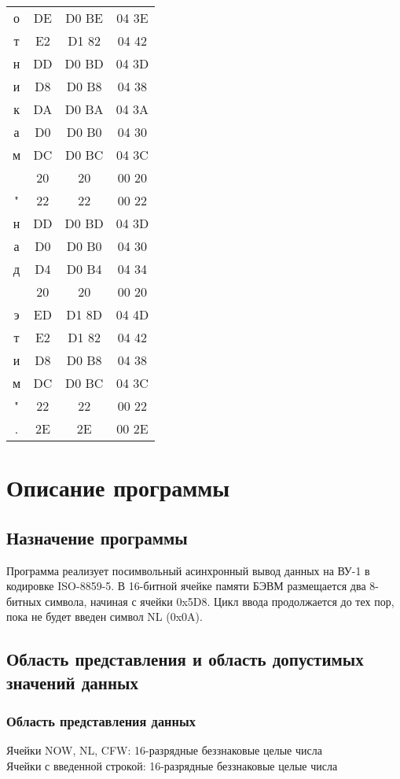 \begin{center}
\begin{tabular}{|c|c|c|c|}
	о & DE & D0 BE & 04 3E\\
	т & E2 & D1 82 & 04 42\\
	н & DD & D0 BD & 04 3D\\
	и & D8 & D0 B8 & 04 38\\
	к & DA & D0 BA & 04 3A\\
	а & D0 & D0 B0 & 04 30\\
	м & DC & D0 BC & 04 3C\\
	& 20 & 20 & 00 20\\
	" & 22 & 22 & 00 22\\
	н & DD & D0 BD & 04 3D\\
	а & D0 & D0 B0 & 04 30\\
	д & D4 & D0 B4 & 04 34\\
	& 20 & 20 & 00 20\\
	э & ED & D1 8D & 04 4D\\
	т & E2 & D1 82 & 04 42\\
	и & D8 & D0 B8 & 04 38\\
	м & DC & D0 BC & 04 3C\\
	" & 22 & 22 & 00 22\\
	. & 2E & 2E & 00 2E\\ 
	\hline
\end{tabular}
\end{center}

\section{Описание программы}
\subsection{Назначение программы}
Программа реализует посимвольный асинхронный вывод данных на ВУ-1 в кодировке ISO-8859-5. В 16-битной ячейке памяти БЭВМ размещается два 8-битных символа, начиная с ячейки 0x5D8. Цикл ввода продолжается до тех пор, пока не будет введен символ NL (0x0A).

\subsection{Область представления и область допустимых значений данных}
\subsubsection{Область представления данных}
\noindent Ячейки NOW, NL, CFW: 16-разрядные беззнаковые целые числа\\
Ячейки с введенной строкой: 16-разрядные беззнаковые целые числа

